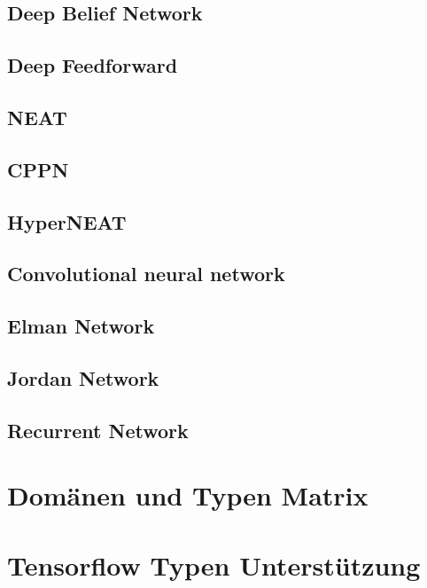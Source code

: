\subsection{Deep Belief Network}

\subsection{Deep Feedforward}

\subsection{NEAT}

\subsection{CPPN}

\subsection{HyperNEAT}

\subsection{Convolutional neural network}

\subsection{Elman Network}

\subsection{Jordan Network}

\subsection{Recurrent Network}

\section{Domänen und Typen Matrix}

\section{Tensorflow Typen Unterstützung}
